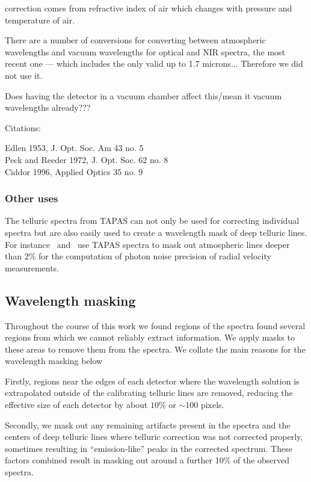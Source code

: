 correction comes from refractive index of air which changes with pressure and temperature of air.

There are a number of conversions for converting between atmospheric wavelengths and vacuum wavelengths for optical and NIR spectra, the most recent one --- which includes the \nir only valid up to 1.7 microns...    
Therefore we did not use it. 

Does having the detector in a vacuum chamber affect this/mean it vacuum wavelengths already???

Citations:

        Edlen 1953, J. Opt. Soc. Am 43 no. 5\\
        Peck and Reeder 1972, J. Opt. Soc. 62 no. 8\\
        Ciddor 1996, Applied Optics 35 no. 9


\subsubsection{Other uses}
The telluric spectra from TAPAS can not only be used for correcting individual spectra but are also easily used to create a wavelength mask of deep telluric lines. For instance~\citet{figueira_radial_2016} and~\citet{artigau_optical_2018} use TAPAS spectra to mask out atmospheric lines deeper than 2\% for the computation of photon noise precision of radial velocity measurements. 


\subsection{Wavelength masking}
Throughout the course of this work we found regions of the spectra found several regions from which we cannot reliably extract information.
We apply masks to these areas to remove them from the spectra. We collate the main reasons for the wavelength masking below 

Firstly, regions near the edges of each detector where the wavelength solution is extrapolated outside of the calibrating telluric lines are removed, reducing the effective size of each detector by about \(10\%\) or \(\sim100\) pixels. 

Secondly, we mask out any remaining artifacts present in the spectra and the centers of deep telluric lines where telluric correction was not corrected properly, sometimes resulting in ``emission-like'' peaks in the corrected spectrum. These factors combined result in masking out around a further 10\% of the observed spectra. 

